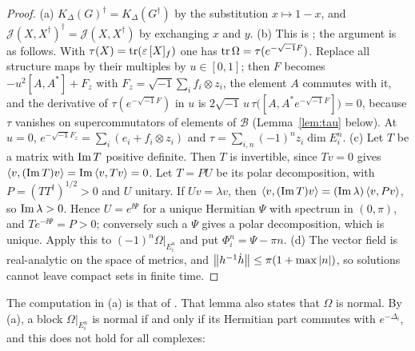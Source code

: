 \begin{proof}
(a) $K_\Delta(G)^\dagger=K_\Delta(G^\dagger)$ by the substitution
$x\mapsto1-x$, and $\mathcal J(X,X^\dagger)^\dagger=\mathcal J(X,X^\dagger)$ by
exchanging $x$ and $y$. (b) This is \cite[Lemma~5.17]{hkkp26}; the argument
is as follows. With $\tau(X)=\operatorname{tr}(\varepsilon\,[X]_f)$ one has
$\operatorname{tr}\Omega=\tau(e^{-\sqrt{-1}F})$. Replace all structure maps by their
multiples by $u\in[0,1]$; then $F$ becomes $-u^2[A,A^*]+F_z$ with
$F_z=\sqrt{-1}\sum_if_i\otimes z_i$, the element $A$ commutes with it, and the
derivative of $\tau(e^{-\sqrt{-1}F})$ in $u$ is
$2\sqrt{-1}\,u\,\tau\bigl([A,A^*e^{-\sqrt{-1}F}]\bigr)=0$, because $\tau$
vanishes on supercommutators of elements of $\mathcal B$
(Lemma~\ref{lem:tau} below). At $u=0$,
$e^{-\sqrt{-1}F_z}=\sum_i(e_i+f_i\otimes z_i)$ and
$\tau=\sum_{i,n}(-1)^nz_i\dim E_i^n$. (c) Let $T$ be a matrix with $\operatorname{Im} T$ positive
definite. Then $T$ is invertible, since $Tv=0$ gives
$\left\langle v,(\operatorname{Im} T)v\right\rangle=\operatorname{Im}\left\langle v,Tv\right\rangle=0$. Let $T=PU$ be its polar
decomposition, with $P=(TT^\dagger)^{1/2}>0$ and $U$ unitary. If
$Uv=\lambda v$, then $\left\langle v,(\operatorname{Im} T)v\right\rangle=(\operatorname{Im}\lambda)\left\langle v,Pv\right\rangle$, so
$\operatorname{Im}\lambda>0$. Hence $U=e^{\ii\Psi}$ for a unique Hermitian $\Psi$ with
spectrum in $(0,\pi)$, and $Te^{-\ii\Psi}=P>0$; conversely such a $\Psi$
gives a polar decomposition, which is unique. Apply this to
$(-1)^n\Omega|_{E_i^n}$ and put $\Phi_i^n=\Psi-\pi n$. (d) The vector field is real-analytic on the space of
metrics, and $\left\lVert h^{-1}\dot h\right\rVert\leq\pi(1+\max|n|)$, so solutions cannot
leave compact sets in finite time.
\end{proof}

The computation in (a) is that of \cite[proof of Lemma~5.16]{hkkp26}. That
lemma also states that $\Omega$ is normal. By (a), a block $\Omega|_{E_i^n}$
is normal if and only if its Hermitian part commutes with $e^{-\Delta_i}$,
and this does not hold for all complexes:

